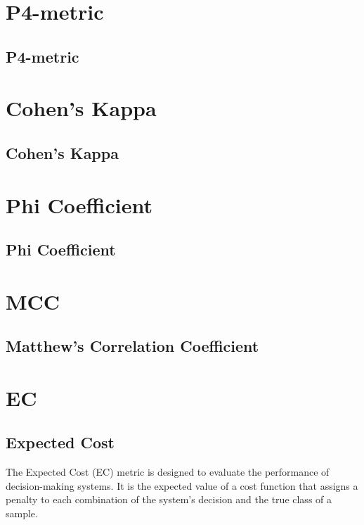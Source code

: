 \clearpage
\thispagestyle{classificationstyle}
\section{P4-metric}
\subsection{P4-metric}

\clearpage
\thispagestyle{classificationstyle}
\section{Cohen's Kappa}
\subsection{Cohen's Kappa}

\clearpage
\thispagestyle{classificationstyle}
\section{Phi Coefficient}
\subsection{Phi Coefficient}

\clearpage
\thispagestyle{classificationstyle}
\section{MCC}
\subsection{Matthew's Correlation Coefficient}


\clearpage
\thispagestyle{classificationstyle}
\section{EC}
\subsection{Expected Cost}

The Expected Cost (EC) metric is designed to evaluate the performance of decision-making systems. It is the expected value of a cost function that assigns a penalty to each combination of the system's decision and the true class of a sample. 

